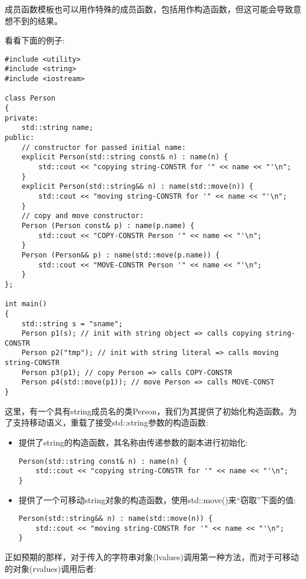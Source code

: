 成员函数模板也可以用作特殊的成员函数，包括用作构造函数，但这可能会导致意想不到的结果。

看看下面的例子:

\begin{lstlisting}[style=styleCXX]
#include <utility>
#include <string>
#include <iostream>

class Person
{
private:
	std::string name;
public:
	// constructor for passed initial name:
	explicit Person(std::string const& n) : name(n) {
		std::cout << "copying string-CONSTR for '" << name << "'\n";
	}
	explicit Person(std::string&& n) : name(std::move(n)) {
		std::cout << "moving string-CONSTR for '" << name << "'\n";
	}
	// copy and move constructor:
	Person (Person const& p) : name(p.name) {
		std::cout << "COPY-CONSTR Person '" << name << "'\n";
	}
	Person (Person&& p) : name(std::move(p.name)) {
		std::cout << "MOVE-CONSTR Person '" << name << "'\n";
	}
};

int main()
{
	std::string s = "sname";
	Person p1(s); // init with string object => calls copying string-CONSTR
	Person p2("tmp"); // init with string literal => calls moving string-CONSTR
	Person p3(p1); // copy Person => calls COPY-CONSTR
	Person p4(std::move(p1)); // move Person => calls MOVE-CONST
}
\end{lstlisting}

这里，有一个具有string成员名的类Person，我们为其提供了初始化构造函数。为了支持移动语义，重载了接受std::string参数的构造函数:

\begin{itemize}
\item 
提供了string的构造函数，其名称由传递参数的副本进行初始化:

\begin{lstlisting}[style=styleCXX]
Person(std::string const& n) : name(n) {
	std::cout << "copying string-CONSTR for '" << name << "'\n";
}
\end{lstlisting}

\item 
提供了一个可移动string对象的构造函数，使用std::move()来“窃取”下面的值:

\begin{lstlisting}[style=styleCXX]
Person(std::string&& n) : name(std::move(n)) {
	std::cout << "moving string-CONSTR for '" << name << "'\n";
}
\end{lstlisting}
\end{itemize}

正如预期的那样，对于传入的字符串对象(lvalues)调用第一种方法，而对于可移动的对象(rvalues)调用后者:

